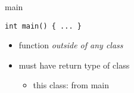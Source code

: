 
\begin{frame}[fragile,label=main]{main}
\lstset{language=C++}
\begin{lstlisting}
int main() { ... }
\end{lstlisting}
\begin{itemize}
\item function \textit{outside of any class}
\item must have return type of class
\begin{itemize}
\item this class:  from main
\end{itemize}
\end{itemize}
\end{frame}
